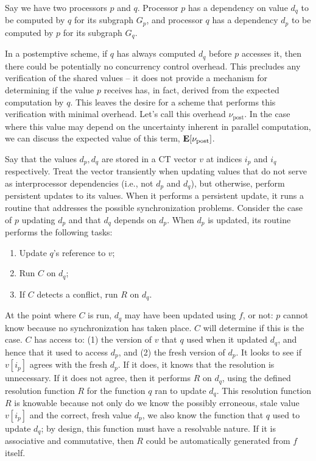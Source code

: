 Say we have two processors $p$ and $q$. Processor $p$ has a dependency on value
$d_q$ to be computed by $q$ for its subgraph $G_p$, and processor $q$ has a
dependency $d_p$ to be computed by $p$ for its subgraph $G_q$.

In a postemptive scheme, if $q$ has always computed $d_q$ before $p$ accesses
it, then there could be potentially no concurrency control overhead. This
precludes any verification of the shared values -- it does not provide a
mechanism for determining if the value $p$ receives has, in fact, derived from
the expected computation by $q$. This leaves the desire for a scheme that
performs this verification with minimal overhead. Let's call this overhead
$\nu_\text{post}$. In the case where this value may depend on the uncertainty
inherent in parallel computation, we can discuss the expected value of this
term, $\mathbf{E}[\nu_\text{post}]$.

Say that the values $d_p, d_q$ are stored in a CT vector $v$ at indices $i_p$
and $i_q$ respectively. Treat the vector transiently when updating values that
do not serve as interprocessor dependencies (i.e., not $d_p$ and $d_q$), but
otherwise, perform persistent updates to its values. When it performs a
persistent update, it runs a routine that addresses the possible synchronization
problems. Consider the case of $p$ updating $d_p$ and that $d_q$ depends on
$d_p$. When $d_p$ is updated, its routine performs the following tasks:
\begin{enumerate}
    \item Update $q$'s reference to $v$;
    \item Run $C$ on $d_q$;
    \item If $C$ detects a conflict, run $R$ on $d_q$.
\end{enumerate}

At the point where $C$ is run, $d_q$ may have been updated using $f$, or not:
$p$ cannot know because no synchronization has taken place. $C$ will determine
if this is the case. $C$ has access to: (1) the version of $v$ that $q$ used
when it updated $d_q$, and hence that it used to access $d_p$, and (2) the fresh
version of $d_p$. It looks to see if $v[i_p]$ agrees with the fresh $d_p$. If it
does, it knows that the resolution is unnecessary. If it does not agree, then it
performs $R$ on $d_q$, using the defined resolution function $R$ for the
function $q$ ran to update $d_q$. This resolution function $R$ is knowable
because not only do we know the possibly erroneous, stale value $v[i_p]$ and the
correct, fresh value $d_p$, we also know the function that $q$ used to update
$d_q$; by design, this function must have a resolvable nature. If it is
associative and commutative, then $R$ could be automatically generated from $f$
itself.

